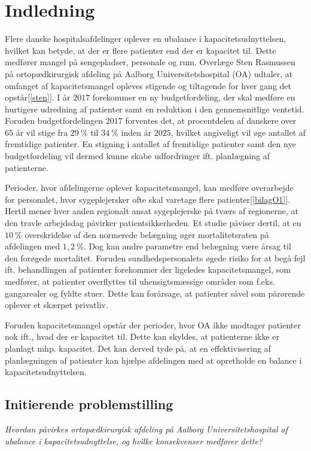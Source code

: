 \chapter{Indledning} \label{indl}
Flere danske hospitalsafdelinger oplever en ubalance i kapacitetsudnyttelsen, hvilket kan betyde, at der er flere patienter end der er kapacitet til. Dette medfører mangel på sengepladser, personale og rum.\cite{Company2013} Overlæge Sten Rasmussen på ortopædkirurgisk afdeling på Aalborg Universitetshospital (OA) udtaler, at omfanget af kapacitetsmangel opleves stigende og tiltagende for hver gang det opstår[\ref{sten}]. I år $2017$ forekommer en ny budgetfordeling, der skal medføre en hurtigere udredning af patienter samt en reduktion i den gennemsnitlige ventetid\cite{Budget2016}. 
Foruden budgetfordelingen $2017$ forventes det, at procentdelen af danskere over $65$ år vil stige fra $29~\%$ til $34~\%$ inden år $2025$, hvilket angiveligt vil øge antallet af fremtidige patienter\cite{Handleplan2016}. En stigning i antallet af fremtidige patienter samt den nye budgetfordeling vil dermed kunne skabe udfordringer ift. planlægning af patienterne.

Perioder, hvor afdelingerne oplever kapacitetsmangel, kan medføre overarbejde for personalet, hvor sygeplejersker ofte skal varetage flere patienter\cite{Danske2015}[\ref{bilagO1}]. Hertil mener hver anden regionalt ansat sygeplejerske på tværs af regionerne, at den travle arbejdsdag påvirker patientsikkerheden\cite{Kjeldsen2015}. Et studie påviser dertil, at en $10~\%$ overskridelse af den normerede belægning øger mortalitetsraten på afdelingen med $1,2~\%$\cite{Madsen2014}. Dog kan andre parametre end belægning være årsag til den forøgede mortalitet. Foruden sundhedspersonalets øgede risiko for at begå fejl ift. behandlingen af patienter forekommer der ligeledes kapacitetsmangel, som medfører, at patienter overflyttes til uhensigtsmæssige områder som f.eks. gangarealer og fyldte stuer\cite{Madsen2014}. Dette kan forårsage, at patienter såvel som pårørende oplever et skærpet privatliv\cite{Heidmann2014}.

Foruden kapacitetsmangel opstår der perioder, hvor OA ikke modtager patienter nok ift., hvad der er kapacitet til\citep{REOS}. Dette kan skyldes, at patienterne ikke er planlagt mhp. kapacitet. Det kan derved tyde på, at en effektivisering af planlægningen af patienter kan hjælpe afdelingen med at opretholde en balance i kapacitetsudnyttelsen. 

\section{Initierende problemstilling}
\textit{Hvordan påvirkes ortopædkirurgisk afdeling på Aalborg Universitetshospital af ubalance i kapacitetsudnyttelse, og hvilke konsekvenser medfører dette?}




